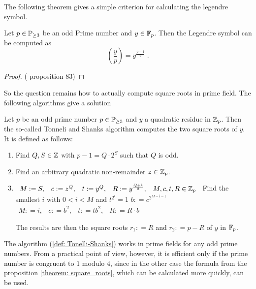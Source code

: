 The following theorem  gives a simple criterion for calculating the legendre symbol.
\begin{theorem}  Let $ p \in \mathbb{P}_{\geq 3} $ be an odd 
Prime number and $ y \in \mathbb{F}_p $. Then the Legendre symbol can be computed as 
\begin{equation}
\label{eq: Euler_criterium}
\left (\frac{y}{p} \right) = y^{\frac{p-1}{2}} \;.
\end{equation}
\end{theorem}
\begin{proof} (\cite{HW} proposition 83) 
\end{proof}
So the question remains how to actually compute square roots in prime field. The following algorithms give a solution
\begin{definition}
\label{def: Tonelli-Shanks}
Let $ p $ be an odd prime number $ p \in \mathbb{P} _{\geq 3} $ and $ y $ a quadratic residue in $ \mathbb{Z}_p $. Then the so-called Tonneli \cite{TA} and Shanks \cite{SD} algorithm computes the two square roots of $ y $. It is defined as follows:
\begin{enumerate}
\item Find $ Q, S \in \mathbb{Z} $ with $ p-1 = Q \cdot 2 ^ S $ such that $ Q $ is odd.
\item Find an arbitrary quadratic non-remainder $ z \in \mathbb{Z}_p $.
\item
\begin{algorithmic}
\State $ \begin{array}{ccccc}
M: = S, & c: = z ^ Q, & t: = y ^ Q, & R: = y ^{\frac{Q + 1}{2}}, & M, c, t, R \in \mathbb{Z}_p
\end{array} $
\State Find the smallest $ i $ with $ 0 <i <M $ and $ t ^{2 ^ i} = 1 $
\State $ b: = c ^{2 ^{M-i-1}} $
\State $ \begin{array}{ccccc}
M: = i, & c: = b ^ 2, & t: = tb ^ 2, & R: = R \cdot b
\end{array} $
\EndWhile
\end{algorithmic}
The results are then the square roots $ r_1: = R $ and $ r_2: = p-R $ of $y$ in $\mathbb{F}_p$.
\end{enumerate}
\end{definition}


\begin{remark}
The algorithm (\ref{def: Tonelli-Shanks}) works in prime fields for any odd prime numbers. From a practical point of view, however, it is efficient only if the prime number is congruent to $ 1 $ modulo $ 4 $, since in the other case the formula from the proposition \ref{theorem: square_roots}, which can be calculated more quickly, can be used.
\end{remark}

